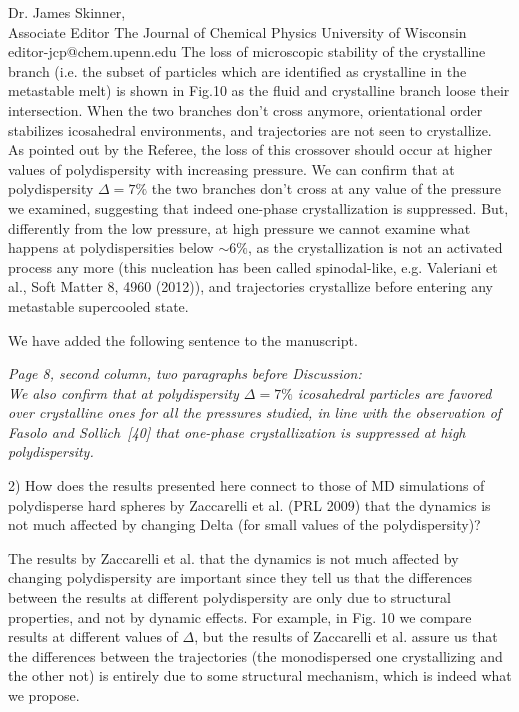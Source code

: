 \documentclass[a4paper, rebuttal, parskip=true, firsthead=false, fromemail=false, foldmarks=false]{scrlttr2}
\begin{document}
\begin{letter}{Dr. James Skinner,\\Associate Editor
The Journal of Chemical Physics
University of Wisconsin\\
editor-jcp@chem.upenn.edu }
The loss of microscopic stability of the crystalline branch (i.e. the subset of particles which are identified as crystalline in the metastable melt)
is shown in Fig.10 as the fluid and crystalline branch loose their intersection. When the two branches don't cross anymore, orientational order
stabilizes icosahedral environments, and trajectories are not seen to crystallize. As pointed out by the Referee,
the loss of this crossover should occur at higher values of polydispersity with
increasing pressure. We can confirm that at polydispersity $\Delta=7\%$ the two branches don't cross at any value of the pressure we examined, suggesting
that indeed one-phase crystallization is suppressed. But, differently from the low pressure, at high pressure we cannot examine
what happens at polydispersities below $\sim 6\%$, as the crystallization is not an activated process any more
(this nucleation has been called spinodal-like, e.g. Valeriani et al., Soft Matter 8, 4960 (2012)), and trajectories crystallize
before entering any metastable supercooled state.

We have added the following sentence to the manuscript.

{\it Page 8, second column, two paragraphs before Discussion:\\
We also confirm that at polydispersity $\Delta=7\%$ icosahedral particles are favored over crystalline ones for
all the pressures studied, in line with the observation of Fasolo and Sollich~[40] that
one-phase crystallization is suppressed at high polydispersity.
}



\begin{quotationi}
2) How does the results presented here connect to those of MD simulations of polydisperse hard spheres by Zaccarelli et al. (PRL 2009) that the dynamics is not much affected by changing Delta (for small values of the polydispersity)?
\end{quotationi}

The results by Zaccarelli et al. that the dynamics is not much affected by changing polydispersity are important since they tell
us that the differences between the results at different polydispersity are only due to structural properties, and not by
dynamic effects. For example, in Fig. 10 we compare results at different values of $\Delta$, but the results of Zaccarelli et al.
assure us that the differences between the trajectories (the monodispersed one crystallizing and the other not) is entirely due
to some structural mechanism, which is indeed what we propose.


\end{letter}
\end{document}

